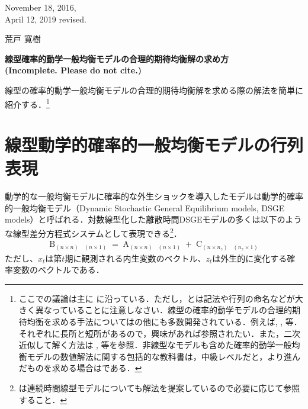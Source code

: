 \documentclass[a4j, dvipdfmx]{jarticle}
\begin{document}
\begin{flushright}
November 18, 2016,\\
April 12, 2019 revised.

荒戸 寛樹
\end{flushright}
\begin{center}
\Large{\textbf{
線型確率的動学一般均衡モデルの合理的期待均衡解の求め方 \\ (Incomplete. Please do not cite.)
}}
\end{center}
\vspace{10pt}
線型の確率的動学一般均衡モデルの合理的期待均衡解を求める際の解法を簡単に紹介する．\footnote{ここでの議論は主に\citet{klein2000} に沿っている．ただし，\citet{klein2000}とは記法や行列の命名などが大きく異なっていることに注意しなさい．線型の確率的動学モデルの合理的期待均衡を求める手法については\citet{klein2000}の他にも多数開発されている．例えば\citet{blanc1989}, \citet{uhlig1999}, \citet{sims2002}等．それぞれに長所と短所があるので，興味があれば参照されたい．また，二次近似して解く方法は \citet{schmi2004}, \citet{kim2008}等を参照．非線型なモデルも含めた確率的動学一般均衡モデルの数値解法に関する包括的な教科書は，中級レベルだと\citet{mccan2008:abcs}，より進んだものを求める場合は\citet{heer2009}である．}
\section{線型動学的確率的一般均衡モデルの行列表現}
動学的な一般均衡モデルに確率的な外生ショックを導入したモデルは動学的確率的一般均衡モデル（Dynamic Stochastic General Equilibrium models, DSGE models）と呼ばれる．対数線型化した離散時間DSGEモデルの多くは以下のような線型差分方程式システムとして表現できる\footnote{\citet{sims2002}は連続時間線型モデルについても解法を提案しているので必要に応じて参照すること．}．
\begin{align}
\mathop{B}_{(n \times n)} \mathop{E_tx_{t+1}}_{(n \times 1)} = \mathop{A}_{(n\times n)} \mathop{x_t}_{(n\times 1)} + \mathop{C}_{(n \times n_z)} \mathop{z_t}_{(n_z \times 1)} \label{model}
\end{align}
ただし、$x_t$は第$t$期に観測される内生変数のベクトル、$z_t$は外生的に変化する確率変数のベクトルである．
\end{document}

